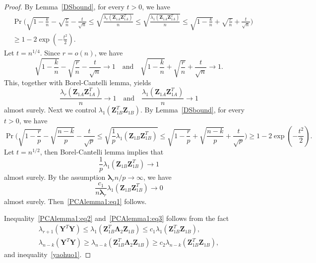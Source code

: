 \documentclass[12pt]{article} %
\newcommand{\bZ}{\mathbf{Z}}
\newcommand{\bY}{\mathbf{Y}}
\newcommand{\bfsym}[1]{\ensuremath{\boldsymbol{#1}}}
\def\blambda {\bfsym {\lambda}}
\def\bLambda {\bfsym {\Lambda}}
\theoremstyle{definition}
\begin{document}
\begin{appendices}
\begin{proof}
    By Lemma~\ref{DSbound}, for every $t>0$, we have
    \begin{equation}\label{yaohuo2}
    \begin{aligned}
        &\Pr\Big(\sqrt{1-\frac{k}{n}}-\sqrt{\frac{r}{n}}-\frac{t}{\sqrt{n}}\leq \sqrt{\frac{\lambda_r(\bZ_{1A}\bZ_{1A}^T)}{n}}\leq \sqrt{\frac{\lambda_1(\bZ_{1A}\bZ_{1A}^T)}{n}}\leq
        \sqrt{1-\frac{k}{n}}+\sqrt{\frac{r}{n}}+\frac{t}{\sqrt{n}} \Big) \\
        &\geq 1-2\exp(-\frac{t^2}{2}).
    \end{aligned}
    \end{equation}
    Let $t=n^{1/4}$. Since $r=o(n)$, we have
    $$
\sqrt{1-\frac{k}{n}}-\sqrt{\frac{r}{n}}-\frac{t}{\sqrt{n}}\to 1\quad\text{and}\quad
\sqrt{1-\frac{k}{n}}+\sqrt{\frac{r}{n}}+\frac{t}{\sqrt{n}}\to 1.
    $$
    This, together with Borel-Cantelli lemma, yields 
    $$
    \frac{\lambda_r(\bZ_{1A}\bZ_{1A}^T)}{n}\to 1\quad\text{and}\quad
    \frac{\lambda_1(\bZ_{1A}\bZ_{1A}^T)}{n}\to 1
    $$
    almost surely.
    Next we control $\lambda_1(\bZ_{1B}^T \bZ_{1B})$. By Lemma~\ref{DSbound}, for every $t>0$, we have
    \begin{equation}\label{yaohuo1}
        \Pr\Big(\sqrt{1-\frac{r}{p}}-\sqrt{\frac{n-k}{p}}-\frac{t}{\sqrt{p}} \leq \sqrt{\frac{1}{p}{\lambda_1(\bZ_{1B}\bZ_{1B}^T)} }\leq \sqrt{1-\frac{r}{p}}+\sqrt{\frac{n-k}{p}}+\frac{t}{\sqrt{p}} \Big) 
   \geq 1-2\exp(-\frac{t^2}{2}).
    \end{equation}
    Let $t=n^{1/2}$, then Borel-Cantelli lemma implies that 
    \begin{equation}\label{eq:qu1}
    \frac{1}{p}\lambda_1(\bZ_{1B}\bZ_{1B}^T)\to 1
    \end{equation}
    almost surely.
By the assumption $\blambda_r n/p\to \infty$, we have $$\frac{c_1}{n\blambda_r}{\lambda_1(\bZ_{1B}\bZ_{1B}^T)}\to 0$$
almost surely.
Then~\eqref{PCAlemma1:eq1} follows.

Inequality~\eqref{PCAlemma1:eq2} and~\eqref{PCAlemma1:eq3} follows from  the fact
\begin{align*}
\lambda_{r+1}(\bY^T \bY)\leq \lambda_1(\bZ_{1B}^T \bLambda_2 \bZ_{1B})\leq c_1 \lambda_1(\bZ_{1B}^T \bZ_{1B}),\\
    \lambda_{n-k}(\bY^T \bY)\geq \lambda_{n-k}(\bZ_{1B}^T \bLambda_2 \bZ_{1B})\geq c_2 \lambda_{n-k}(\bZ_{1B}^T \bZ_{1B}),
\end{align*}
and inequality~\eqref{yaohuo1}.
\end{proof}



\end{appendices}
\end{document}
